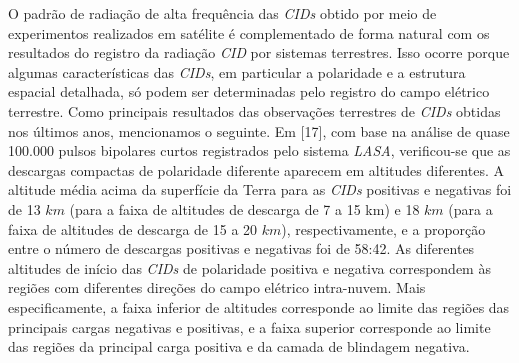 \documentclass[a4paper, 12pt, onecolumn,singlespacing]{article}
\begin{document}
	O padrão de radiação de alta frequência das \textit{CIDs} obtido por meio de experimentos realizados em satélite é complementado de forma natural com os resultados do registro da radiação \textit{CID} por sistemas terrestres. Isso ocorre porque algumas características das \textit{CIDs}, em particular a polaridade e a estrutura espacial detalhada, só podem ser determinadas pelo registro do campo elétrico terrestre. Como principais resultados das observações terrestres de \textit{CIDs} obtidas nos últimos anos, mencionamos o seguinte. Em [17], com base na análise de quase 100.000 pulsos bipolares curtos registrados pelo sistema \textit{LASA}, verificou-se que as descargas compactas de polaridade diferente aparecem em altitudes diferentes. A altitude média acima da superfície da Terra para as \textit{CIDs} positivas e negativas foi de 13 $km$ (para a faixa de altitudes de descarga de 7 a 15 km) e 18 $km$ (para a faixa de altitudes de descarga de 15 a 20 $km$), respectivamente, e a proporção entre o número de descargas positivas e negativas foi de 58:42. As diferentes altitudes de início das \textit{CIDs} de polaridade positiva e negativa correspondem às regiões com diferentes direções do campo elétrico intra-nuvem. Mais especificamente, a faixa inferior de altitudes corresponde ao limite das regiões das principais cargas negativas e positivas, e a faixa superior corresponde ao limite das regiões da principal carga positiva e da camada de blindagem negativa.
	
\end{document}
